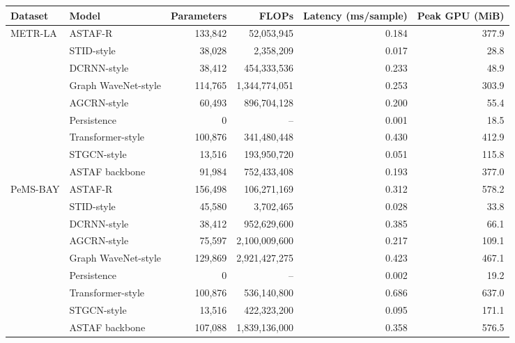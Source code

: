 \begin{tabular}{llrrrr}
\toprule
Dataset & Model & Parameters & FLOPs & Latency (ms/sample) & Peak GPU (MiB)\\
\midrule
METR-LA & ASTAF-R & 133,842 & 52,053,945 & 0.184 & 377.9\\
 & STID-style & 38,028 & 2,358,209 & 0.017 & 28.8\\
 & DCRNN-style & 38,412 & 454,333,536 & 0.233 & 48.9\\
 & Graph WaveNet-style & 114,765 & 1,344,774,051 & 0.253 & 303.9\\
 & AGCRN-style & 60,493 & 896,704,128 & 0.200 & 55.4\\
 & Persistence & 0 & -- & 0.001 & 18.5\\
 & Transformer-style & 100,876 & 341,480,448 & 0.430 & 412.9\\
 & STGCN-style & 13,516 & 193,950,720 & 0.051 & 115.8\\
 & ASTAF backbone & 91,984 & 752,433,408 & 0.193 & 377.0\\
\midrule
PeMS-BAY & ASTAF-R & 156,498 & 106,271,169 & 0.312 & 578.2\\
 & STID-style & 45,580 & 3,702,465 & 0.028 & 33.8\\
 & DCRNN-style & 38,412 & 952,629,600 & 0.385 & 66.1\\
 & AGCRN-style & 75,597 & 2,100,009,600 & 0.217 & 109.1\\
 & Graph WaveNet-style & 129,869 & 2,921,427,275 & 0.423 & 467.1\\
 & Persistence & 0 & -- & 0.002 & 19.2\\
 & Transformer-style & 100,876 & 536,140,800 & 0.686 & 637.0\\
 & STGCN-style & 13,516 & 422,323,200 & 0.095 & 171.1\\
 & ASTAF backbone & 107,088 & 1,839,136,000 & 0.358 & 576.5\\
\bottomrule
\end{tabular}